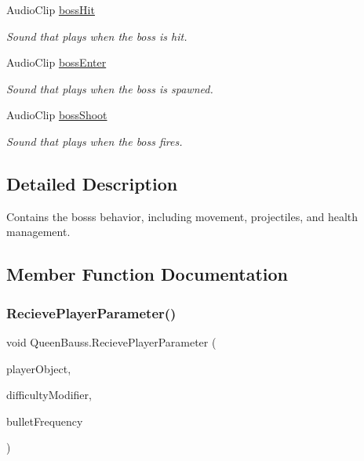 \begin{DoxyCompactItemize}
Audio\+Clip \mbox{\hyperlink{class_queen_bauss_a6166e72e2c9d4056bffe09629f55c61f}{boss\+Hit}}
\begin{DoxyCompactList}\small\item\em Sound that plays when the boss is hit. \end{DoxyCompactList}\item 
Audio\+Clip \mbox{\hyperlink{class_queen_bauss_a63ad4d36e93462b57ae6de42ceb642ae}{boss\+Enter}}
\begin{DoxyCompactList}\small\item\em Sound that plays when the boss is spawned. \end{DoxyCompactList}\item 
Audio\+Clip \mbox{\hyperlink{class_queen_bauss_a9cff9aa86adc0ceccbd311bd007f5b5c}{boss\+Shoot}}
\begin{DoxyCompactList}\small\item\em Sound that plays when the boss fires. \end{DoxyCompactList}\end{DoxyCompactItemize}


\subsection{Detailed Description}
Contains the boss\textquotesingle{}s behavior, including movement, projectiles, and health management. 

\subsection{Member Function Documentation}
\mbox{\label{class_queen_bauss_a40fa065ef12d2fa9e9483c271d3e75a6}} 
\subsubsection{\texorpdfstring{RecievePlayerParameter()}{RecievePlayerParameter()}}
{\footnotesize\ttfamily void Queen\+Bauss.\+Recieve\+Player\+Parameter (\begin{DoxyParamCaption}\item[{Game\+Object}]{player\+Object,  }\item[{int}]{difficulty\+Modifier,  }\item[{float}]{bullet\+Frequency }\end{DoxyParamCaption})}


